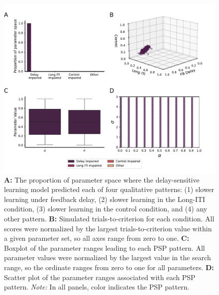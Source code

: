 \documentclass[doc, floatsintext]{apa7}
\begin{document}
\begin{figure}
  \centering
  \includegraphics[width=1\textwidth]{../figures/model_procedural_supervised.pdf}
  \caption{ 
      \textbf{A:} The proportion of parameter space where
      the delay-sensitive learning model predicted each of
      four qualitative patterns: (1) slower learning under
      feedback delay, (2) slower learning in the Long-ITI
      condition, (3) slower learning in the control
      condition, and (4) any other pattern. 
      \textbf{B:} Simulated trials-to-criterion for each
      condition. All scores were normalized by the largest
      trials-to-criterion value within a given parameter
      set, so all axes range from zero to one. 
      \textbf{C:} Boxplot of the parameter ranges leading to
      each PSP pattern. All parameter values were normalized
      by the largest value in the search range, so the
      ordinate ranges from zero to one for all parameters.
      \textbf{D:} Scatter plot of the parameter ranges
      associated with each PSP pattern. 
      \textit{Note:} In all panels, color indicates the PSP
      pattern.
}
  \label{fig:DSL_results}
\end{figure}
\end{document}
